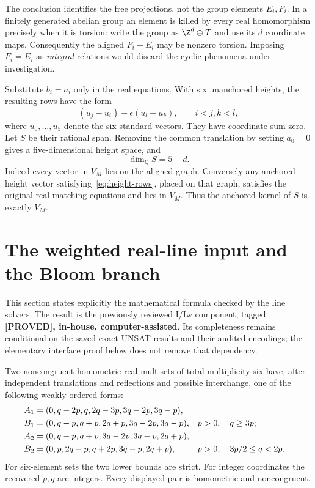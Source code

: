 The conclusion identifies the free projections, not the group elements
$E_i,F_i$. In a finitely generated abelian group an element is killed by
every real homomorphism precisely when it is torsion: write the group as
$\Z^d\oplus T$ and use its $d$ coordinate maps. Consequently the aligned
$F_i-E_i$ may be nonzero torsion. Imposing $F_i=E_i$ as \emph{integral}
relations would discard the cyclic phenomena under investigation.

Substitute $b_i=a_i$ only in the real equations. With six unanchored
heights, the resulting rows have the form
\begin{equation}\label{eq:height-rows}
 (u_j-u_i)-\epsilon(u_l-u_k),\qquad i<j, k<l,
\end{equation}
where $u_0,\ldots,u_5$ denote the six standard vectors. They have coordinate
sum zero. Let $S$ be their rational span. Removing the common translation
by setting $a_0=0$ gives a five-dimensional height space, and
\begin{equation}\label{eq:height-codimension}
 \dim_{\mathbb Q}S=5-d.
\end{equation}
Indeed every vector in $V_M$ lies on the aligned graph. Conversely any
anchored height vector satisfying~\eqref{eq:height-rows}, placed on that
graph, satisfies the original real matching equations and lies in $V_M$.
Thus the anchored kernel of $S$ is exactly $V_M$.

\section{The weighted real-line input and the Bloom branch}
\label{sec:formal-bloom}
This section states explicitly the mathematical formula checked by the
line solvers. The result is the previously reviewed I/Iw component, tagged
\textbf{[PROVED], in-house, computer-assisted}. Its completeness remains
conditional on the saved exact UNSAT results and their audited encodings;
the elementary interface proof below does not remove that dependency.

\begin{lemma}\label{lem:iw}
Two noncongruent homometric real multisets of total multiplicity six
have, after independent translations and reflections and possible
interchange, one of the following weakly ordered forms:
\begin{align}
 A_1&=(0,q-2p,q,2q-3p,3q-2p,3q-p),\notag\\
 B_1&=(0,q-p,q+p,2q+p,3q-2p,3q-p),
       &&p>0,\quad q\ge3p;\label{eq:weighted-form-one}\\
 A_2&=(0,q-p,q+p,3q-2p,3q-p,2q+p),\notag\\
 B_2&=(0,p,2q-p,q+2p,3q-p,2q+p),
       &&p>0,\quad 3p/2\le q<2p.\label{eq:weighted-form-two}
\end{align}
For six-element sets the two lower bounds are strict. For integer
coordinates the recovered $p,q$ are integers. Every displayed pair is
homometric and noncongruent.
\end{lemma}


